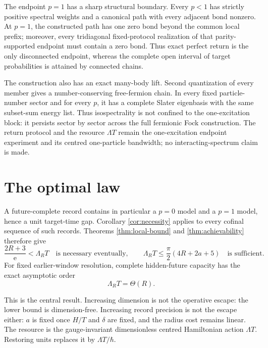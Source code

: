 \documentclass[10pt]{article}
\numberwithin{equation}{section}
\theoremstyle{definition}
\theoremstyle{remark}
\newcommand{\ee}{\mathrm e}
\begin{document}
The endpoint \(p=1\) has a sharp structural boundary.  Every \(p<1\) has
strictly positive spectral weights and a canonical path with every adjacent
bond nonzero.  At \(p=1\), the constructed path has one zero bond beyond the
common local prefix; moreover, every tridiagonal fixed-protocol realization
of that parity-supported endpoint must contain a zero bond.  Thus exact
perfect return is the only disconnected endpoint, whereas the complete open
interval of target probabilities is attained by connected chains.

The construction also has an exact many-body lift.  Second quantization of
every member gives a number-conserving free-fermion chain.  In every fixed
particle-number sector and for every \(p\), it has a complete Slater
eigenbasis with the same subset-sum energy list.  Thus isospectrality is not
confined to the one-excitation block: it persists sector by sector across
the full fermionic Fock construction.  The return protocol and the resource
\(\Lambda T\) remain the one-excitation endpoint experiment and its centred
one-particle bandwidth; no interacting-spectrum claim is made.

\section{The optimal law}

A future-complete record contains in particular a \(p=0\) model and a
\(p=1\) model, hence a unit target-time gap.  Corollary
\ref{cor:necessity} applies to every cofinal sequence of such records.
Theorems \ref{thm:local-bound} and \ref{thm:achievability} therefore give
\begin{equation}
 \boxed{
 \frac{2R+3}{\ee}
 < \Lambda_R T
 \quad\text{is necessary eventually},\qquad
 \Lambda_R T
 \le \frac{\pi}{2}(4R+2a+5)
 \quad\text{is sufficient}.
 }
\label{eq:optimal-law}
\end{equation}
For fixed earlier-window resolution, complete hidden-future capacity has
the exact asymptotic order
\begin{equation}
 \Lambda_R T=\Theta(R).
\label{eq:theta}
\end{equation}

This is the central result.  Increasing dimension is not the operative
escape: the lower bound is dimension-free.  Increasing record precision is
not the escape either: \(a\) is fixed once \(H/T\) and \(\delta\) are fixed,
and the radius cost remains linear.  The resource is the gauge-invariant
dimensionless centred Hamiltonian action \(\Lambda T\).  Restoring units
replaces it by
\(\Lambda T/\hbar\).
\end{document}
